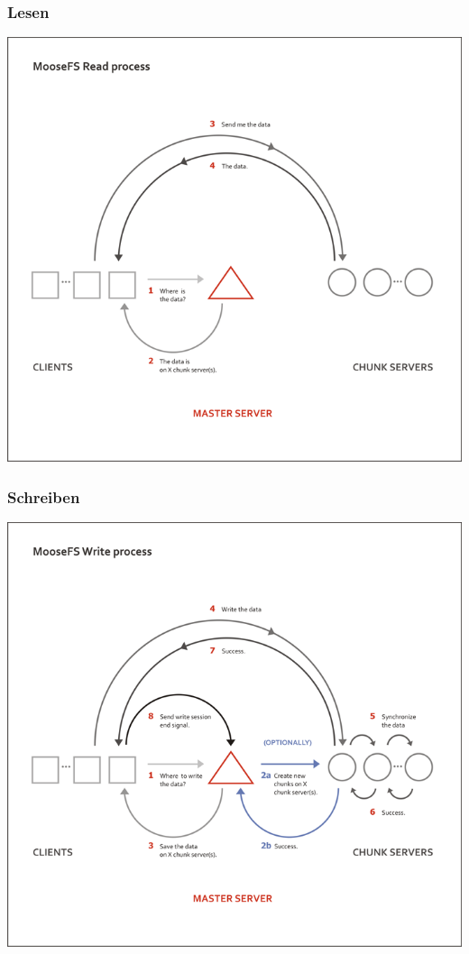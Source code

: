 \documentclass{beamer}
\begin{document}
\begin{frame}
	\frametitle{Lesen}
	\centering
	\includegraphics[scale=0.3]{read.png}
\end{frame}

\begin{frame}
	\frametitle{Schreiben}
	\centering
	\includegraphics[scale=0.3]{write.png}
\end{frame}
\end{document}
